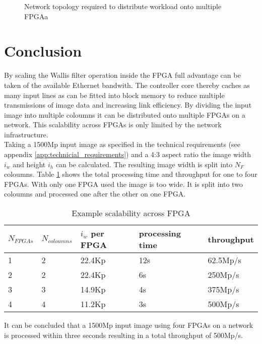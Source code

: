 \begin{figure}[b!]
    \centering
    \begin{adjustbox}{max height=5cm}
        
    \end{adjustbox}
    \caption{Network topology required to distribute workload onto multiple
    FPGAa}
    \label{fig:sca:network}
\end{figure}

\section{Conclusion}
By scaling the Wallis filter operation inside the FPGA full advantage can be
taken of the available Ethernet bandwith. The controller core thereby caches as
many input lines as can be fitted into block memory to reduce multiple
transmissions of image data and increasing link efficiency. By dividing the input
image into multiple coloumns it can be distributed onto multiple FPGAs on a
network. This scalability across FPGAs is only limited by the network
infrastructure.
\\


Taking a 1500Mp input image as specified in the technical requirements (see
appendix \ref{app:technicial_requirements}) and a 4:3 aspect ratio the image
width $i_w$ and height $i_h$ can be calculated. The resulting image width is
split into $N_F$ coloumns. Table \ref{tab:sca:exacrfpga} shows the total
processing time and throughput for one to four FPGAs. With only one FPGA used
the image is too wide. It is split into two coloumns and processed one after the
other on one FPGA.

\begin{table}[h!]
    \centering
    \begin{tabular}{l l l l l}
        \toprule
        $N_{FPGAs}$ & $N_{coloumns}$ & $i_w$ per FPGA &
        processing time & throughput \\
        \midrule
        1  & 2 &  22.4Kp & 12s & 62.5Mp/s \\
        2  & 2 &  22.4Kp & 6s  & 250Mp/s \\
        3  & 3 &  14.9Kp & 4s  & 375Mp/s \\
        4  & 4 &  11.2Kp & 3s  & 500Mp/s \\
        \bottomrule
    \end{tabular}
    \caption{Example scalability across FPGA}
    \label{tab:sca:exacrfpga}
\end{table}

It can be concluded that a 1500Mp input image using four FPGAs on a network is
processed within three seconds resulting in a total throughput of 500Mp/s.

